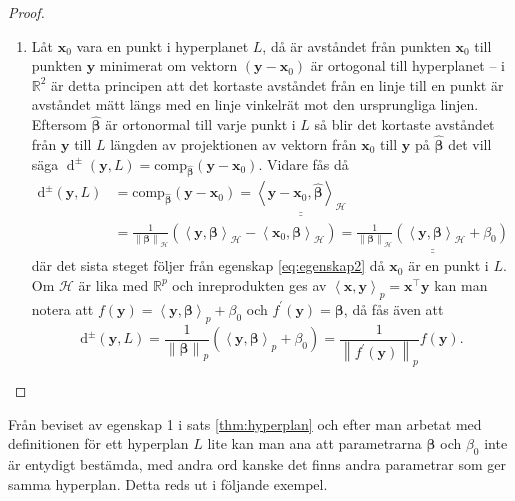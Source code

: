 \documentclass[a4paper, 12pt]{report}
\theoremstyle{definition}
\theoremstyle{remark}
\newcommand{\bfbeta}{{\boldsymbol{\beta}}}
\newcommand{\bfx}{\mathbf{x}}
\newcommand{\bfy}{\mathbf{y}}
\newcommand{\llangle}{\left\langle}
\newcommand{\rrangle}{\right\rangle}
\newcommand{\inner}[2]{\llangle #1, #2 \rrangle}
\newcommand{\hil}{\mathcal{H}}
\begin{document}
\begin{proof}
\begin{enumerate}
	\item Låt $\mathbf{x}_0$ vara en punkt i hyperplanet $L$, då är avståndet från punkten $\bfx_0$ till punkten $\bfy$ minimerat om vektorn $\left(\bfy-\bfx_0\right)$ är ortogonal till hyperplanet -- i $\mathbb{R}^2$ är detta principen att det kortaste avståndet från en linje till en punkt är avståndet mätt längs med en linje vinkelrät mot den ursprungliga linjen.
	Eftersom $\widehat{\bfbeta}$ är ortonormal till varje punkt i $L$ så blir det kortaste avståndet från $\bfy$ till $L$ längden av projektionen av vektorn från $\bfx_0$ till $\bfy$ på $\widehat{\bfbeta}$ det vill säga $\operatorname{d}^\pm \left(\mathbf{y}, L\right)=\operatorname{comp_{\widehat{\bfbeta}}} \left( \bfy - \mathbf{x}_0 \right)$.
	Vidare fås då
	\begin{align*}
		\operatorname{d^\pm} \left( \bfy, L \right) &= \operatorname{comp_{\widehat{\bfbeta}}} \left( \bfy - \mathbf{x}_0 \right)
		=\underline{\underline{ \inner{\bfy - \mathbf{x}_0}{\widehat{\bfbeta}}_\hil}}\\
		&= \frac{1}{\left\|\bfbeta
\right\|_\hil}\left(\inner{\bfy}{\bfbeta}_\hil - \inner{\bfx_0}{\bfbeta}_\hil\right)=\underline{\underline{\frac{1}{\left\|\bfbeta
\right\|_\hil}\left(\inner{\bfy}{\bfbeta}_\hil + \beta_0\right)}}
	\end{align*}
	där det sista steget följer från egenskap \ref{eq:egenskap2} då $\mathbf{x}_0$ är en punkt i $L$.
	Om $\hil$ är lika med $\mathbb{R}^p$ och inreprodukten ges av $\inner{\bfx}{\bfy}_p=\bfx^\intercal\bfy$ kan man notera att $f\left(\bfy\right)=\inner{\bfy}{\bfbeta}_p+\beta_0$ och $f^\prime\left(\bfy\right)=\bfbeta$, då fås även att
	\begin{equation*}
		\operatorname{d^\pm} \left( \bfy, L \right)=\frac{1}{\left\|\bfbeta
\right\|_p}\left(\inner{\bfy}{\bfbeta}_p + \beta_0\right)=\frac{1}{\left\|f^\prime\left(\bfy\right)
\right\|_p}f\left(\bfy\right).
	\end{equation*}
	\qedhere
\end{enumerate}
\end{proof}

Från beviset av egenskap 1 i sats \ref{thm:hyperplan} och efter man arbetat med definitionen för ett hyperplan $L$ lite kan man ana att parametrarna $\bfbeta$ och $\beta_0$ inte är entydigt bestämda, med andra ord kanske det finns andra parametrar som ger samma hyperplan. Detta reds ut i följande exempel.
\end{document}
